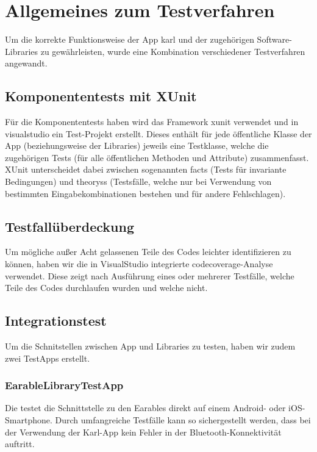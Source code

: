 \documentclass[../validierung.tex]{subfiles}
\begin{document}
\clearpage

\section{Allgemeines zum Testverfahren}
Um die korrekte Funktionsweise der App \Gls{karl} und der zugehörigen Software-Libraries zu gewährleisten,
wurde eine Kombination verschiedener Testverfahren angewandt.

\subsection{Komponententests mit XUnit}
Für die Komponententests haben wird das Framework \Gls{xunit} verwendet und in \gls{visualstudio} ein Test-Projekt erstellt.
Dieses enthält für jede öffentliche Klasse der App (beziehungsweise der Libraries) jeweils eine Testklasse, welche die zugehörigen Tests (für alle öffentlichen Methoden und Attribute) zusammenfasst.
XUnit unterscheidet dabei zwischen sogenannten \Gls{fact}s (Tests für invariante Bedingungen) und \Glspl{theory}s (Testsfälle, welche nur bei Verwendung von bestimmten Eingabekombinationen bestehen und für andere Fehlschlagen).

\subsection{Testfallüberdeckung}
Um mögliche außer Acht gelassenen Teile des Codes leichter identifizieren zu können, haben wir die in VisualStudio integrierte \Gls{codecoverage}-Analyse verwendet.
Diese zeigt nach Ausführung eines oder mehrerer Testfälle, welche Teile des Codes durchlaufen wurden und welche nicht.

\subsection{Integrationstest}
Um die Schnitstellen zwischen App und Libraries zu testen, haben wir zudem zwei \Gls{TestApp}s erstellt.

\subsubsection{EarableLibraryTestApp}
Die  testet die Schnittstelle zu den Earables direkt auf einem Android- oder iOS-Smartphone.
Durch umfangreiche Testfälle kann so sichergestellt werden, dass bei der Verwendung der Karl-App kein Fehler in der Bluetooth-Konnektivität auftritt.
\end{document}
